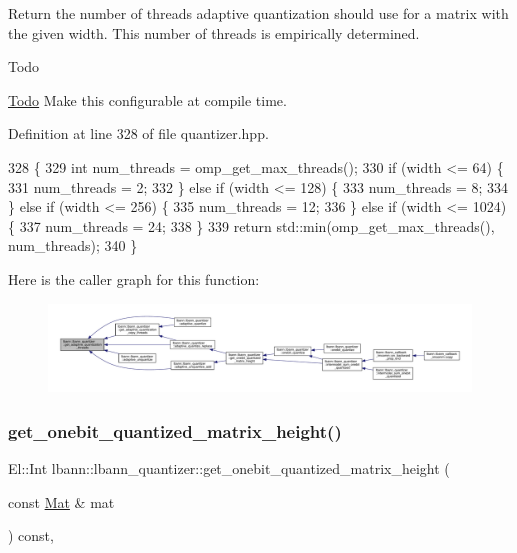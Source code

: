Return the number of threads adaptive quantization should use for a matrix with the given width. This number of threads is empirically determined. \begin{DoxyRefDesc}{Todo}
\item[\hyperlink{todo__todo000028}{Todo}]Make this configurable at compile time. \end{DoxyRefDesc}


Definition at line 328 of file quantizer.\+hpp.


\begin{DoxyCode}
328                                                             \{
329     \textcolor{keywordtype}{int} num\_threads = omp\_get\_max\_threads();
330     \textcolor{keywordflow}{if} (width <= 64) \{
331       num\_threads = 2;
332     \} \textcolor{keywordflow}{else} \textcolor{keywordflow}{if} (width <= 128) \{
333       num\_threads = 8;
334     \} \textcolor{keywordflow}{else} \textcolor{keywordflow}{if} (width <= 256) \{
335       num\_threads = 12;
336     \} \textcolor{keywordflow}{else} \textcolor{keywordflow}{if} (width <= 1024) \{
337       num\_threads = 24;
338     \}
339     \textcolor{keywordflow}{return} std::min(omp\_get\_max\_threads(), num\_threads);
340   \}
\end{DoxyCode}
Here is the caller graph for this function\+:\nopagebreak
\begin{figure}[H]
\begin{center}
\leavevmode
\includegraphics[width=350pt]{classlbann_1_1lbann__quantizer_aaa0c20f755437130172c40ca8e95bc3f_icgraph}
\end{center}
\end{figure}
\mbox{\label{classlbann_1_1lbann__quantizer_aa1541b9afa60250dbd570acbbe98242f}} 
\subsubsection{\texorpdfstring{get\+\_\+onebit\+\_\+quantized\+\_\+matrix\+\_\+height()}{get\_onebit\_quantized\_matrix\_height()}}
{\footnotesize\ttfamily El\+::\+Int lbann\+::lbann\+\_\+quantizer\+::get\+\_\+onebit\+\_\+quantized\+\_\+matrix\+\_\+height (\begin{DoxyParamCaption}\item[{const \hyperlink{base_8hpp_a68f11fdc31b62516cb310831bbe54d73}{Mat} \&}]{mat }\end{DoxyParamCaption}) const\hspace{0.3cm}{\ttfamily [inline]}, {\ttfamily [private]}}

